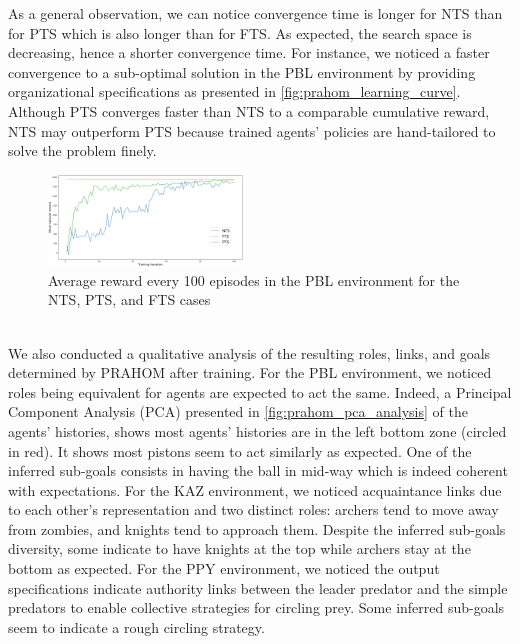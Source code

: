 \documentclass[doubleblind]{ecai}
\begin{document}
As a general observation, we can notice convergence time is longer for NTS than for PTS which is also longer than for FTS. As expected, the search space is decreasing, hence a shorter convergence time. For instance, we noticed a faster convergence to a sub-optimal solution in the PBL environment by providing organizational specifications as presented in \autoref{fig:prahom_learning_curve}. Although PTS converges faster than NTS to a comparable cumulative reward, NTS may outperform PTS because trained agents' policies are hand-tailored to solve the problem finely.
%
%
% 
%
%
%
\begin{figure}[h!]
    \centering
    \includegraphics[width=0.46\textwidth]{figures/prahom_learning_curve.png}
    \caption{Average reward every 100 episodes in the PBL environment for the NTS, PTS, and FTS cases\\ \phantom{X} \\}
    \label{fig:prahom_learning_curve}
\end{figure}

We also conducted a qualitative analysis of the resulting roles, links, and goals determined by PRAHOM after training.
%
For the PBL environment, we noticed roles being equivalent for agents are expected to act the same. Indeed, a Principal Component Analysis (PCA) presented in \autoref{fig:prahom_pca_analysis} of the agents' histories, shows most agents’ histories are in the left bottom zone (circled in red). It shows most pistons seem to act similarly as expected. One of the inferred sub-goals consists in having the ball in mid-way which is indeed coherent with expectations.
%
For the KAZ environment, we noticed acquaintance links due to each other's representation and two distinct roles: archers tend to move away from zombies, and knights tend to approach them. Despite the inferred sub-goals diversity, some indicate to have knights at the top while archers stay at the bottom as expected. 
%
For the PPY environment, we noticed the output specifications indicate authority links between the leader predator and the simple predators to enable collective strategies for circling prey. Some inferred sub-goals seem to indicate a rough circling strategy.
\end{document}
